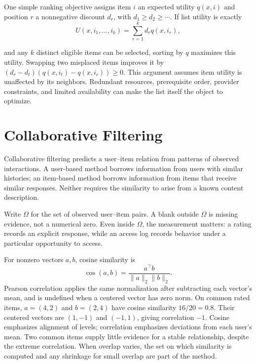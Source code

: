 \par\noindent\begin{minipage}{\linewidth}
One simple ranking objective assigns item $i$ an expected utility $q(x,i)$ and position $r$ a nonnegative discount $d_r$, with $d_1\ge d_2\ge\cdots$. If list utility is exactly
\[
U(x,i_1,\ldots,i_k)=\sum_{r=1}^k d_r q(x,i_r),
\]
\end{minipage}\par\addvspace{\belowdisplayskip}
and any $k$ distinct eligible items can be selected, sorting by $q$ maximizes this utility. Swapping two misplaced items improves it by $(d_r-d_t)(q(x,i_t)-q(x,i_r))\ge0$. This argument assumes item utility is unaffected by its neighbors. Redundant resources, prerequisite order, provider constraints, and limited availability can make the list itself the object to optimize.

\section{Collaborative Filtering}
\label{sec:collab-filter}

Collaborative filtering predicts a user--item relation from patterns of observed interactions. A user-based method borrows information from users with similar histories; an item-based method borrows information from items that receive similar responses. Neither requires the similarity to arise from a known content description.

Write $\Omega$ for the set of observed user--item pairs. A blank outside $\Omega$ is missing evidence, not a numerical zero. Even inside $\Omega$, the measurement matters: a rating records an explicit response, while an access log records behavior under a particular opportunity to access.

For nonzero vectors $a,b$, cosine similarity is
\[
\operatorname{cos}(a,b)=\frac{a^\top b}{\|a\|_2\|b\|_2}.
\]
Pearson correlation applies the same normalization after subtracting each vector's mean, and is undefined when a centered vector has zero norm. On common rated items, $a=(4,2)$ and $b=(2,4)$ have cosine similarity $16/20=0.8$. Their centered vectors are $(1,-1)$ and $(-1,1)$, giving correlation $-1$. Cosine emphasizes alignment of levels; correlation emphasizes deviations from each user's mean. Two common items supply little evidence for a stable relationship, despite the extreme correlation. When overlap varies, the set on which similarity is computed and any shrinkage for small overlap are part of the method.

